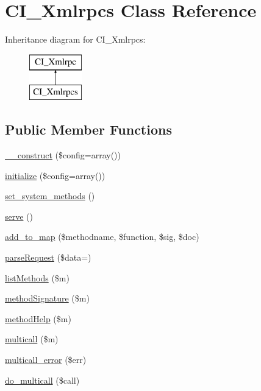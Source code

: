 \hypertarget{class_c_i___xmlrpcs}{}\section{C\+I\+\_\+\+Xmlrpcs Class Reference}
\label{class_c_i___xmlrpcs}
Inheritance diagram for C\+I\+\_\+\+Xmlrpcs\+:\begin{figure}[H]
\begin{center}
\leavevmode
\includegraphics[height=2.000000cm]{class_c_i___xmlrpcs}
\end{center}
\end{figure}
\subsection*{Public Member Functions}
\begin{DoxyCompactItemize}
\item 
\mbox{\hyperlink{class_c_i___xmlrpcs_a664d04143396d4ff91c27a3d7c405471}{\+\_\+\+\_\+construct}} (\$config=array())
\item 
\mbox{\hyperlink{class_c_i___xmlrpcs_a6080aed29552bc4c061e10ecd0c95bc1}{initialize}} (\$config=array())
\item 
\mbox{\hyperlink{class_c_i___xmlrpcs_ab41cc6466b3c52388b3c643335133983}{set\+\_\+system\+\_\+methods}} ()
\item 
\mbox{\hyperlink{class_c_i___xmlrpcs_ac18666825e2eed123d41fb0a14b0ccd7}{serve}} ()
\item 
\mbox{\hyperlink{class_c_i___xmlrpcs_affc4e3194f56c4c58f1e3f2cac8298c4}{add\+\_\+to\+\_\+map}} (\$methodname, \$function, \$sig, \$doc)
\item 
\mbox{\hyperlink{class_c_i___xmlrpcs_a604e7a09bfad10bbcc0aacf6f25b14da}{parse\+Request}} (\$data=\textquotesingle{}\textquotesingle{})
\item 
\mbox{\hyperlink{class_c_i___xmlrpcs_a834bad153f5338a1dd22ea98de45ea4d}{list\+Methods}} (\$m)
\item 
\mbox{\hyperlink{class_c_i___xmlrpcs_a13f551d9331bcb01d1514e78793ba34e}{method\+Signature}} (\$m)
\item 
\mbox{\hyperlink{class_c_i___xmlrpcs_a2c52d6ca367f0e7a208863ba1db188e5}{method\+Help}} (\$m)
\item 
\mbox{\hyperlink{class_c_i___xmlrpcs_a7bebfcaf8163990496e4ae88dbc64688}{multicall}} (\$m)
\item 
\mbox{\hyperlink{class_c_i___xmlrpcs_ac1cfc70f00dece7139d33623da533e13}{multicall\+\_\+error}} (\$err)
\item 
\mbox{\hyperlink{class_c_i___xmlrpcs_a3b498b783093dc4180466790ec2de400}{do\+\_\+multicall}} (\$call)
\end{DoxyCompactItemize}
